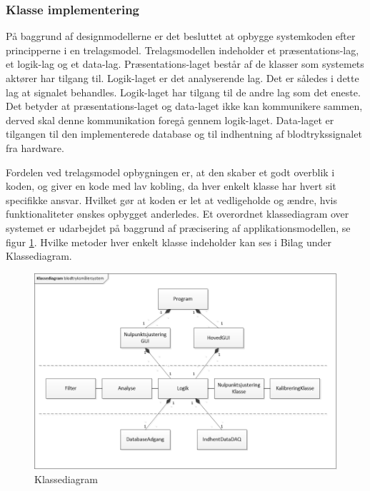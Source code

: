 \subsubsection{Klasse implementering}
På baggrund af designmodellerne er det besluttet at opbygge systemkoden efter principperne i en trelagsmodel\cite{3lagsmodel}. Trelagsmodellen indeholder et præsentations-lag, et logik-lag og et data-lag. Præsentations-laget består af de klasser som systemets aktører har tilgang til. Logik-laget er det analyserende lag. Det er således i dette lag at signalet behandles. Logik-laget har tilgang til de andre lag som det eneste. Det betyder at præsentations-laget og data-laget ikke kan kommunikere sammen, derved skal denne kommunikation foregå gennem logik-laget. Data-laget er tilgangen til den implementerede database og til indhentning af blodtrykssignalet fra hardware.

Fordelen ved trelagsmodel opbygningen er, at den skaber et godt overblik i koden, og giver en kode med lav kobling, da hver enkelt klasse har hvert sit specifikke ansvar. Hvilket gør at koden er let at vedligeholde og ændre, hvis funktionaliteter ønskes opbygget anderledes. Et overordnet klassediagram over systemet er udarbejdet på baggrund af præcisering af applikationsmodellen, se figur \ref{fig:KlassediagramSW}. Hvilke metoder hver enkelt klasse indeholder kan ses i Bilag under Klassediagram. 
\begin{figure}[H]
	\centering
	\includegraphics[width=1.0\textwidth]{Figurer/Klassediagram}
	\caption{Klassediagram}
	\label{fig:KlassediagramSW}
\end{figure}

